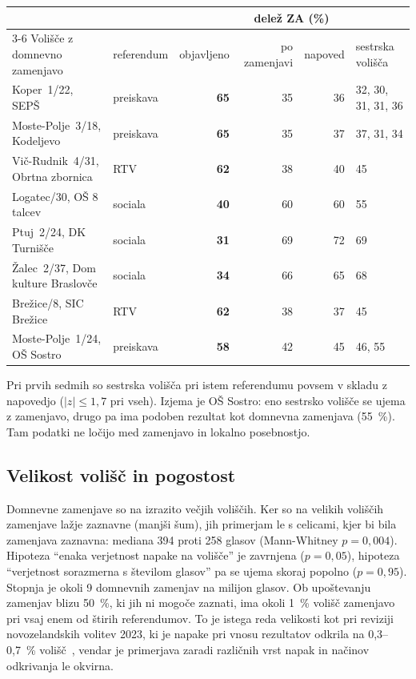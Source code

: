 \documentclass[11pt,a4paper]{article}
\begin{document}
\begin{center}
\small\setlength{\tabcolsep}{4pt}\begin{tabular}{llrrrl}
\toprule
 & & \multicolumn{4}{c}{delež ZA (\%)} \\
\cmidrule(lr){3-6}
Volišče z domnevno zamenjavo & referendum & objavljeno & po zamenjavi & napoved & sestrska volišča \\
\midrule
Koper~1/22, SEPŠ & preiskava & \textbf{65} & 35 & 36 & 32, 30, 31, 31, 36 \\
Moste-Polje~3/18, Kodeljevo & preiskava & \textbf{65} & 35 & 37 & 37, 31, 34 \\
Vič-Rudnik~4/31, Obrtna zbornica & RTV & \textbf{62} & 38 & 40 & 45 \\
Logatec/30, OŠ 8 talcev & sociala & \textbf{40} & 60 & 60 & 55 \\
Ptuj~2/24, DK Turnišče & sociala & \textbf{31} & 69 & 72 & 69 \\
Žalec~2/37, Dom kulture Braslovče & sociala & \textbf{34} & 66 & 65 & 68 \\
Brežice/8, SIC Brežice & RTV & \textbf{62} & 38 & 37 & 45 \\
Moste-Polje~1/24, OŠ Sostro & preiskava & \textbf{58} & 42 & 45 & 46, 55 \\
\bottomrule
\end{tabular}
\end{center}

Pri prvih sedmih so sestrska volišča pri istem referendumu povsem v skladu z napovedjo ($|z|\leq1{,}7$ pri vseh). Izjema je OŠ Sostro: eno sestrsko volišče se ujema z zamenjavo, drugo pa ima podoben rezultat kot domnevna zamenjava (55~\%). Tam podatki ne ločijo med zamenjavo in lokalno posebnostjo.

\subsection{Velikost volišč in pogostost}

Domnevne zamenjave so na izrazito večjih voliščih. Ker so na velikih voliščih zamenjave lažje zaznavne (manjši šum), jih primerjam le s celicami, kjer bi bila zamenjava zaznavna: mediana 394 proti 258 glasov (Mann-Whitney $p=0{,}004$). Hipoteza ``enaka verjetnost napake na volišče'' je zavrnjena ($p=0{,}05$), hipoteza ``verjetnost sorazmerna s številom glasov'' pa se ujema skoraj popolno ($p=0{,}95$). Stopnja je okoli 9 domnevnih zamenjav na milijon glasov. Ob upoštevanju zamenjav blizu 50~\%, ki jih ni mogoče zaznati, ima okoli 1~\% volišč zamenjavo pri vsaj enem od štirih referendumov. To je istega reda velikosti kot pri reviziji novozelandskih volitev 2023, ki je napake pri vnosu rezultatov odkrila na 0,3--0,7~\% volišč~\cite{oagnz2024}, vendar je primerjava zaradi različnih vrst napak in načinov odkrivanja le okvirna.
\end{document}

